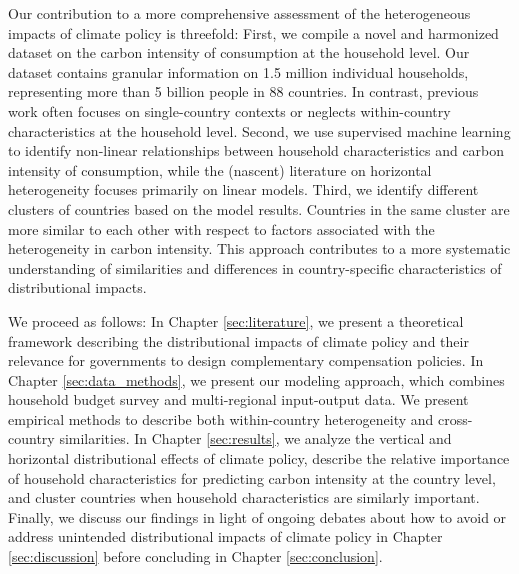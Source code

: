 \documentclass[12pt, a4paper]{article}
\begin{document}
Our contribution to a more comprehensive assessment of the heterogeneous impacts of climate policy is threefold: First, we compile a novel and harmonized dataset on the carbon intensity of consumption at the household level. Our dataset contains granular information on 1.5 million individual households, representing more than 5 billion people in 88 countries. In contrast, previous work often focuses on single-country contexts or neglects within-country characteristics at the household level. Second, we use supervised machine learning to identify non-linear relationships between household characteristics and carbon intensity of consumption, while the (nascent) literature on horizontal heterogeneity focuses primarily on linear models. Third, we identify different clusters of countries based on the model results. Countries in the same cluster are more similar to each other with respect to factors associated with the heterogeneity in carbon intensity. This approach contributes to a more systematic understanding of similarities and differences in country-specific characteristics of distributional impacts. %

We proceed as follows: In Chapter \ref{sec:literature}, we present a theoretical framework describing the distributional impacts of climate policy and their relevance for governments to design complementary compensation policies. In Chapter \ref{sec:data_methods}, we present our modeling approach, which combines household budget survey and multi-regional input-output data. We present empirical methods to describe both within-country heterogeneity and cross-country similarities. In Chapter \ref{sec:results}, we analyze the vertical and horizontal distributional effects of climate policy, describe the relative importance of household characteristics for predicting carbon intensity at the country level, and cluster countries when household characteristics are similarly important. Finally, we discuss our findings in light of ongoing debates about how to avoid or address unintended distributional impacts of climate policy in Chapter \ref{sec:discussion} before concluding in Chapter \ref{sec:conclusion}.  

\end{document}
